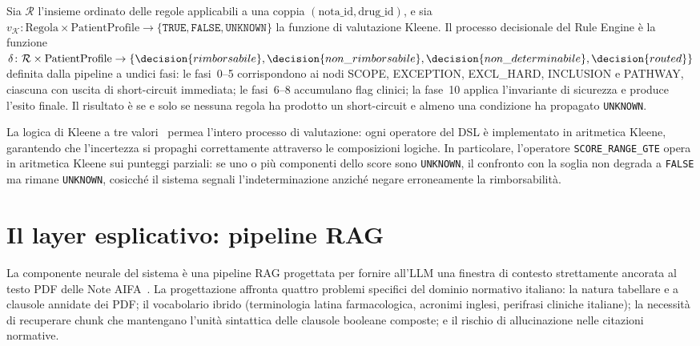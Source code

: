 \begin{definition}
\label{def:decisione}
Sia $\mathcal{R}$ l'insieme ordinato delle regole applicabili a una coppia
$(\text{nota\_id}, \text{drug\_id})$, e sia
$v_\mathcal{K} \colon \text{Regola} \times \text{PatientProfile}
\to \{\texttt{TRUE}, \texttt{FALSE}, \texttt{UNKNOWN}\}$
la funzione di valutazione Kleene.
Il processo decisionale del Rule Engine è la funzione
$\delta \colon \mathcal{R} \times \text{PatientProfile}
\to \{\decision{rimborsabile}, \decision{non\_rimborsabile},
\decision{non\_determinabile}, \decision{routed}\}$
definita dalla pipeline a undici fasi: le fasi~0--5 corrispondono ai nodi
SCOPE, EXCEPTION, EXCL\_HARD, INCLUSION e PATHWAY, ciascuna con uscita
di short-circuit immediata; le fasi~6--8 accumulano flag clinici;
la fase~10 applica l'invariante di sicurezza e produce l'esito finale.
Il risultato è  se e solo se nessuna
regola ha prodotto un short-circuit e almeno una condizione ha
propagato \texttt{UNKNOWN}.
\end{definition}

La logica di Kleene a tre valori~\cite{kleene1952introduction} permea l'intero
processo di valutazione: ogni operatore del DSL è implementato in aritmetica
Kleene, garantendo che l'incertezza si propaghi correttamente attraverso
le composizioni logiche.
In particolare, l'operatore \texttt{SCORE\_RANGE\_GTE} opera in aritmetica
Kleene sui punteggi parziali: se uno o più componenti dello score sono
\texttt{UNKNOWN}, il confronto con la soglia non degrada a \texttt{FALSE}
ma rimane \texttt{UNKNOWN}, cosicché il sistema segnali l'indeterminazione
anziché negare erroneamente la rimborsabilità.

\section{Il layer esplicativo: pipeline RAG}
\label{sec:layer-esplicativo}

La componente neurale del sistema è una pipeline RAG progettata per fornire
all'LLM una finestra di contesto strettamente ancorata al testo PDF delle
Note AIFA~\cite{lewis2020rag}.
La progettazione affronta quattro problemi specifici del dominio normativo
italiano: la natura tabellare e a clausole annidate dei PDF; il vocabolario
ibrido (terminologia latina farmacologica, acronimi inglesi, perifrasi
cliniche italiane); la necessità di recuperare chunk che mantengano l'unità
sintattica delle clausole booleane composte; e il rischio di allucinazione
nelle citazioni normative.

